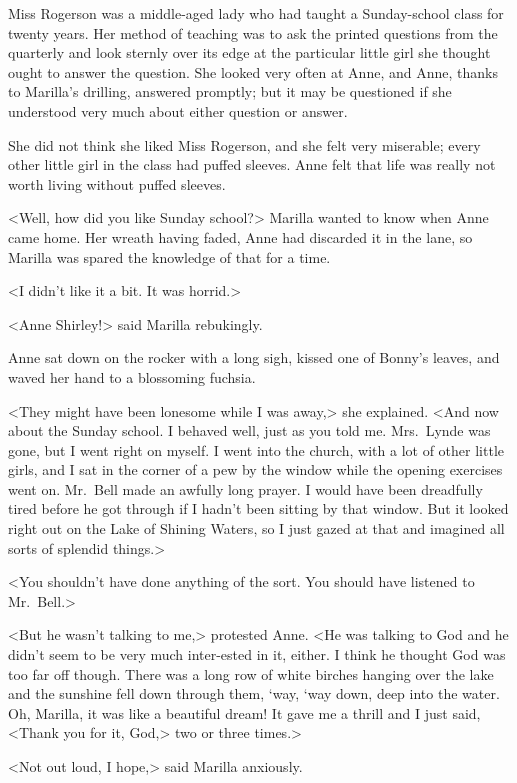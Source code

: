 Miss Rogerson was a middle-aged lady who had taught a Sunday-school class for twenty years. Her method of teaching was to ask the printed questions from the quarterly and look sternly over its edge at the particular little girl she thought ought to answer the question. She looked very often at Anne, and Anne, thanks to Marilla's drilling, answered promptly; but it may be questioned if she understood very much about either question or answer.

She did not think she liked Miss Rogerson, and she felt very miserable; every other little girl in the class had puffed sleeves. Anne felt that life was really not worth living without puffed sleeves.

<Well, how did you like Sunday school?> Marilla wanted to know when Anne came home. Her wreath having faded, Anne had discarded it in the lane, so Marilla was spared the knowledge of that for a time.

<I didn't like it a bit. It was horrid.>

<Anne Shirley!> said Marilla rebukingly.

Anne sat down on the rocker with a long sigh, kissed one of Bonny's leaves, and waved her hand to a blossoming fuchsia.

<They might have been lonesome while I was away,> she explained. <And now about the Sunday school. I behaved well, just as you told me. Mrs.~Lynde was gone, but I went right on myself. I went into the church, with a lot of other little girls, and I sat in the corner of a pew by the window while the opening exercises went on. Mr.~Bell made an awfully long prayer. I would have been dreadfully tired before he got through if I hadn't been sitting by that window. But it looked right out on the Lake of Shining Waters, so I just gazed at that and imagined all sorts of splendid things.>

<You shouldn't have done anything of the sort. You should have listened to Mr.~Bell.>

<But he wasn't talking to me,> protested Anne. <He was talking to God and he didn't seem to be very much inter-ested in it, either. I think he thought God was too far off though. There was a long row of white birches hanging over the lake and the sunshine fell down through them, ‘way, ‘way down, deep into the water. Oh, Marilla, it was like a beautiful dream! It gave me a thrill and I just said, <Thank you for it, God,> two or three times.>

<Not out loud, I hope,> said Marilla anxiously.

